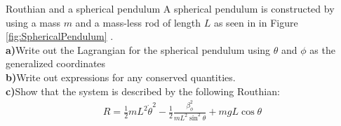 \begin{problem}{Routhian and a spherical pendulum}
A spherical pendulum is constructed by using a mass $m$ and a mass-less rod of length $L$ as seen in in Figure \ref{fig:SphericalPendulum} .
\\
\textbf{a)}Write out the Lagrangian for the spherical pendulum using $\theta$ and $\phi$ as the generalized coordinates\\
\textbf{b)}Write out expressions for any conserved quantities.\\
\textbf{c)}Show that the system is described by the following Routhian:
\begin{align*}
R = \frac{1}{2}mL^2\dot\theta^2-\frac{1}{2}\frac{\beta_\phi^2}{mL^2\sin^2\theta}+mgL\cos\theta
\end{align*}
\\
\label{prob_Lagrange_12}
\end{problem}


